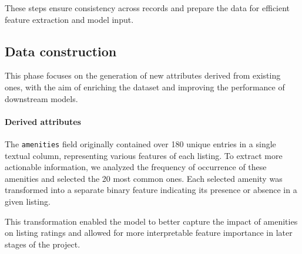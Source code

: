 These steps ensure consistency across records and prepare the data for efficient feature extraction and model input.

\subsection{Data construction}\label{sec:dataConstruction}
This phase focuses on the generation of new attributes derived from existing ones, with the aim of enriching the dataset and improving the performance of downstream models.

\paragraph{Derived attributes}
The \texttt{amenities} field originally contained over 180 unique entries in a single textual column, representing various features of each listing. To extract more actionable information, we analyzed the frequency of occurrence of these amenities and selected the 20 most common ones. Each selected amenity was transformed into a separate binary feature indicating its presence or absence in a given listing.

This transformation enabled the model to better capture the impact of amenities on listing ratings and allowed for more interpretable feature importance in later stages of the project.
